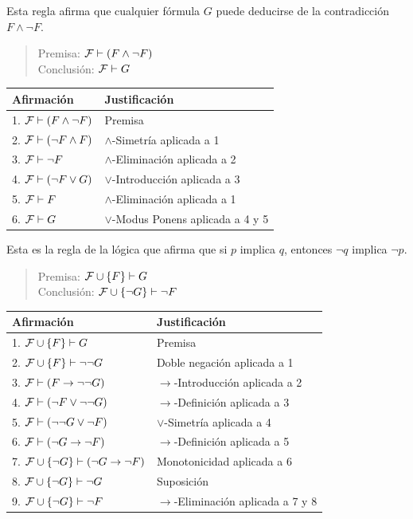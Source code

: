 \documentclass[12pt,a4paper]{book}
\makeatletter
\newenvironment{derivacion}{%
  \begingroup
  \renewcommand{\arraystretch}{1.35}
  \begin{center}
  \begin{tabular}{@{}l l@{}}
    \textbf{Afirmación} & \textbf{Justificación}\\
    \hline
}{%
  \end{tabular}
  \end{center}
  \endgroup
}
\makeatother
\begin{document}
    \begin{ejemplo}\label{ej:regla-contradiccion}
        Esta regla afirma que cualquier fórmula $G$ puede deducirse de la contradicción $F\wedge\neg F$.

        \begin{quote}
            Premisa: $\mathcal{F}\vdash(F\wedge\neg F)$\\
            Conclusión: $\mathcal{F}\vdash G$
        \end{quote}

        \begin{derivacion}
            1. $\mathcal{F}\vdash(F\wedge\neg F)$ & Premisa\\
            2. $\mathcal{F}\vdash(\neg F\wedge F)$ & $\wedge$-Simetría aplicada a 1\\
            3. $\mathcal{F}\vdash\neg F$ & $\wedge$-Eliminación aplicada a 2\\
            4. $\mathcal{F}\vdash(\neg F\vee G)$ & $\vee$-Introducción aplicada a 3\\
            5. $\mathcal{F}\vdash F$ & $\wedge$-Eliminación aplicada a 1\\
            6. $\mathcal{F}\vdash G$ & $\vee$-Modus Ponens aplicada a 4 y 5\\
        \end{derivacion}
    \end{ejemplo}

    \begin{ejemplo}[Contrapositiva]\label{ej:contrapositiva}
        Esta es la regla de la lógica que afirma que si $p$ implica $q$, entonces $\neg q$ implica $\neg p$.

        \begin{quote}
            Premisa: $\mathcal{F}\cup\{F\}\vdash G$\\
            Conclusión: $\mathcal{F}\cup\{\neg G\}\vdash\neg F$
        \end{quote}

        \begin{derivacion}
            1. $\mathcal{F}\cup\{F\}\vdash G$ & Premisa\\
            2. $\mathcal{F}\cup\{F\}\vdash\neg\neg G$ & Doble negación aplicada a 1\\
            3. $\mathcal{F}\vdash(F\rightarrow\neg\neg G)$ & $\rightarrow$-Introducción aplicada a 2\\
            4. $\mathcal{F}\vdash(\neg F\vee\neg\neg G)$ & $\rightarrow$-Definición aplicada a 3\\
            5. $\mathcal{F}\vdash(\neg\neg G\vee\neg F)$ & $\vee$-Simetría aplicada a 4\\
            6. $\mathcal{F}\vdash(\neg G\rightarrow\neg F)$ & $\rightarrow$-Definición aplicada a 5\\
            7. $\mathcal{F}\cup\{\neg G\}\vdash(\neg G\rightarrow\neg F)$ & Monotonicidad aplicada a 6\\
            8. $\mathcal{F}\cup\{\neg G\}\vdash\neg G$ & Suposición\\
            9. $\mathcal{F}\cup\{\neg G\}\vdash\neg F$ & $\rightarrow$-Eliminación aplicada a 7 y 8\\
        \end{derivacion}
    \end{ejemplo}
\end{document}
